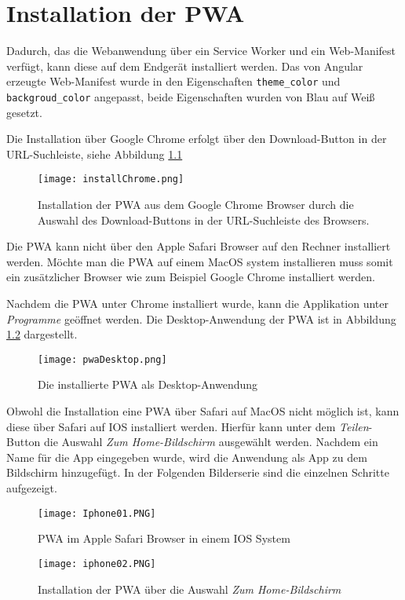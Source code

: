 \chapter{Installation der PWA}

Dadurch, das die Webanwendung über ein Service Worker und ein Web-Manifest verfügt, kann diese auf dem Endgerät installiert werden. Das von Angular erzeugte Web-Manifest wurde in den Eigenschaften \texttt{theme\_color} und \texttt{backgroud\_color} angepasst, beide Eigenschaften wurden von Blau auf Weiß gesetzt.

Die Installation über Google Chrome erfolgt über den Download-Button in der URL-Suchleiste, siehe Abbildung \ref{img:installChrome}

\begin{figure}[!htb]
    \centering
    \texttt{[image: installChrome.png]}
    \caption{Installation der PWA aus dem Google Chrome Browser durch die Auswahl des Download-Buttons in der URL-Suchleiste des Browsers.}
    \label{img:installChrome}
\end{figure}

Die PWA kann nicht über den Apple Safari Browser auf den Rechner installiert werden. Möchte man die PWA auf einem MacOS system installieren muss somit ein zusätzlicher Browser wie zum Beispiel Google Chrome installiert werden. 

Nachdem die PWA unter Chrome installiert wurde, kann die Applikation unter \textit{Programme} geöffnet werden. Die Desktop-Anwendung der PWA ist in Abbildung \ref{img:desktopPwa} dargestellt.

\begin{figure}[!htb]
    \centering
    \texttt{[image: pwaDesktop.png]}
    \caption{Die installierte PWA als Desktop-Anwendung}
    \label{img:desktopPwa}
\end{figure}

Obwohl die Installation eine PWA über Safari auf MacOS nicht möglich ist, kann diese über Safari auf IOS installiert werden. Hierfür kann unter dem \textit{Teilen}-Button die Auswahl \textit{Zum Home-Bildschirm} ausgewählt werden. Nachdem ein Name für die App eingegeben wurde, wird die Anwendung als App zu dem Bildschirm hinzugefügt. In der Folgenden Bilderserie sind die einzelnen Schritte aufgezeigt. 

\begin{figure}
    \begin{minipage}[b]{.4\linewidth} %
       \texttt{[image: Iphone01.PNG]}
       \caption{PWA im Apple Safari Browser in einem IOS System}
    \end{minipage}
    \hspace{.1\linewidth}%
    \begin{minipage}[b]{.4\linewidth} %
       \texttt{[image: iphone02.PNG]}
       \caption{Installation der PWA über die Auswahl \textit{Zum Home-Bildschirm}}
    \end{minipage}
 \end{figure}

